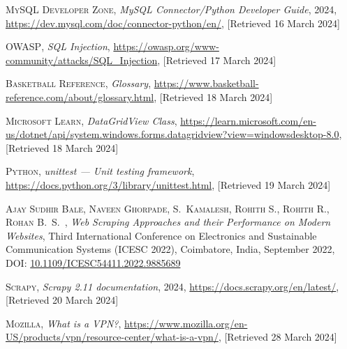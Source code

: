 \documentclass{thesis-ekf}
\theoremstyle{definition}
\theoremstyle{remark}
\begin{document}
\begin{thebibliography}{2}
\textsc{MySQL Developer Zone},
\emph{MySQL Connector/Python Developer Guide}, 2024,
\url{https://dev.mysql.com/doc/connector-python/en/}, [Retrieved 16 March 2024]

\textsc{OWASP},
\emph{SQL Injection},
\url{https://owasp.org/www-community/attacks/SQL_Injection}, [Retrieved 17 March 2024]

\textsc{Basketball Reference},
\emph{Glossary},
\url{https://www.basketball-reference.com/about/glossary.html}, [Retrieved 18 March 2024]

\textsc{Microsoft Learn},
\emph{DataGridView Class},
\url{https://learn.microsoft.com/en-us/dotnet/api/system.windows.forms.datagridview?view=windowsdesktop-8.0}, [Retrieved 18 March 2024]

\textsc{Python},
\emph{unittest — Unit testing framework},
\url{https://docs.python.org/3/library/unittest.html}, [Retrieved 19 March 2024]

\textsc{Ajay Sudhir Bale, Naveen Ghorpade, S.~Kamalesh, Rohith S., Rohith R., Rohan B.~S.~},
\emph{Web Scraping Approaches and their Performance on Modern Websites},
Third International Conference on Electronics and Sustainable Communication Systems (ICESC 2022),
Coimbatore, India, September 2022,
DOI: \href{https://doi.org/10.1109/ICESC54411.2022.9885689}{10.1109/ICESC54411.2022.9885689}

\textsc{Scrapy},
\emph{Scrapy 2.11 documentation}, 2024, 
\url{https://docs.scrapy.org/en/latest/}, [Retrieved 20 March 2024]

\textsc{Mozilla},
\emph{What is a VPN?},
\url{https://www.mozilla.org/en-US/products/vpn/resource-center/what-is-a-vpn/}, [Retrieved 28 March 2024]

\end{thebibliography}




\end{document}
